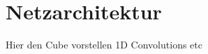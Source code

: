 \section{Netzarchitektur}
\label{raeumliche_netzarchitektur}

Hier den Cube vorstellen
1D Convolutions etc

